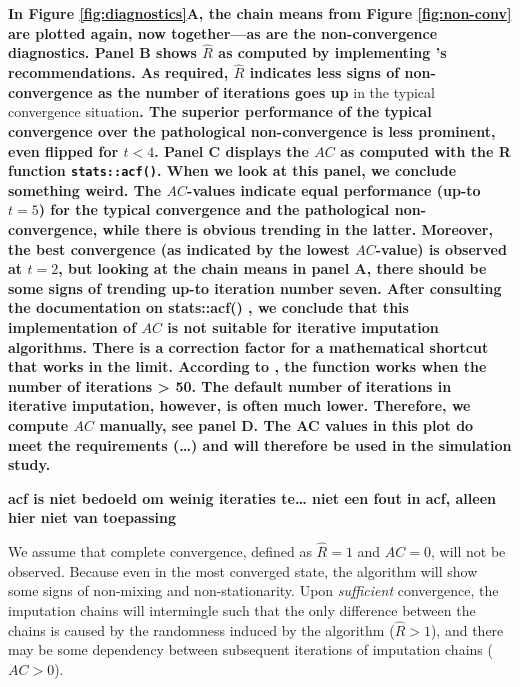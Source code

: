 \documentclass[Royal,times,sageh]{sagej}
\begin{document}
\textbf{In Figure \ref{fig:diagnostics}A, the chain means from Figure
\ref{fig:non-conv} are plotted again, now together---as are the
non-convergence diagnostics. Panel B shows \(\widehat{R}\) as computed
by implementing \citet{veht19} 's recommendations. As required,
\(\widehat{R}\) indicates less signs of non-convergence as the number of
iterations goes up }in the typical convergence situation\textbf{. The
superior performance of the typical convergence over the pathological
non-convergence is less prominent, even flipped for \(t<4\). Panel C
displays the \(AC\) as computed with the R function
\texttt{stats::acf()}. When we look at this panel, we conclude something
weird. The \(AC\)-values indicate equal performance (up-to \(t=5\)) for
the typical convergence and the pathological non-convergence, while
there is obvious trending in the latter. Moreover, the best convergence
(as indicated by the lowest \(AC\)-value) is observed at \(t=2\), but
looking at the chain means in panel A, there should be some signs of
trending up-to iteration number seven. After consulting the
documentation on stats::acf() \citep{R}, we conclude that this
implementation of \(AC\) is not suitable for iterative imputation
algorithms. There is a correction factor for a mathematical shortcut
that works in the limit. According to \citet{box15}, the function works
when the number of iterations \textgreater{} 50. The default number of
iterations in iterative imputation, however, is often much lower.
Therefore, we compute \(AC\) manually, see panel D. The AC values in
this plot do meet the requirements (\ldots) and will therefore be used
in the simulation study.}

\textbf{acf is niet bedoeld om weinig iteraties te\ldots{} niet een fout
in acf, alleen hier niet van toepassing}

We assume that complete convergence, defined as \(\widehat{R} = 1\) and
\(AC = 0\), will not be observed. Because even in the most converged
state, the algorithm will show some signs of non-mixing and
non-stationarity. Upon \emph{sufficient} convergence, the imputation
chains will intermingle such that the only difference between the chains
is caused by the randomness induced by the algorithm
(\(\widehat{R} > 1\)), and there may be some dependency between
subsequent iterations of imputation chains (\(AC > 0\)).
\end{document}
